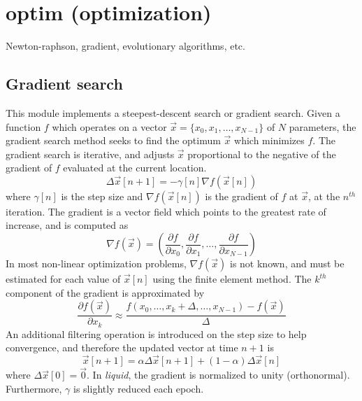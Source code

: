 \section{optim (optimization)}
Newton-raphson, gradient, evolutionary algorithms, etc.

\subsection{Gradient search}
This module implements a steepest-descent search or gradient search.
Given a function $f$ which operates on a vector
$\vec{x} = \{x_0,x_1,\ldots,x_{N-1}\}$ of $N$ parameters,
the gradient search method seeks to find the optimum $\vec{x}$ which
minimizes $f$.
The gradient search is iterative, and adjusts $\vec{x}$ proportional to the
negative of the gradient of $f$ evaluated at the current location.
\[
    \Delta \vec{x}[n+1] = -\gamma[n] \nabla f(\vec{x}[n])
\]
where $\gamma[n]$ is the step size and
$\nabla f(\vec{x}[n])$ is the gradient of $f$ at $\vec{x}$, at the $n^{th}$
iteration.
The gradient is a vector field which points to the greatest rate of increase,
and is computed as
\[
    \nabla f(\vec{x}) = \left(
        \frac{\partial f}{\partial x_0},
        \frac{\partial f}{\partial x_1},
        \ldots,
        \frac{\partial f}{\partial x_{N-1}}
    \right)
\]
In most non-linear optimization problems, $\nabla f(\vec{x})$ is not known,
and must be estimated for each value of $\vec{x}[n]$ using the finite element
method.
The $k^{th}$ component of the gradient is approximated by
\[
    \frac{\partial f(\vec{x})}{\partial x_k} \approx 
    \frac{f(x_0,\ldots,x_k+\Delta,\ldots,x_{N-1}) - f(\vec{x})}{\Delta}
\]
An additional filtering operation is introduced on the step size to help
convergence, and therefore the updated vector at time $n+1$ is
\[
    \vec{x}[n+1] = \alpha \Delta\vec{x}[n+1] + (1-\alpha)\Delta\vec{x}[n]
\]
where $\Delta\vec{x}[0] = \vec{0}$.
In {\it liquid}, the gradient is normalized to unity (orthonormal).
Furthermore, $\gamma$ is slightly reduced each epoch.




